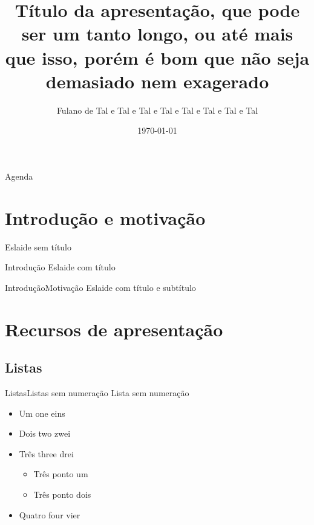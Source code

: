 \documentclass[
	brazilian, %
	14pt, %
]{beamer}
\title{Título da apresentação, que pode ser um tanto longo, ou até mais que isso, porém é bom que não seja demasiado nem exagerado}
\author{Fulano de Tal e Tal e Tal e Tal e Tal e Tal e Tal e Tal}
\date{\today} %
\institute{DC -- UFSCar}
\begin{document}
\begin{frame}
	\titlepage	
	
\end{frame}

\begin{frame}{Agenda}
	\tableofcontents
	
	
	\note{\structure{\tableofcontents}}
\end{frame}


%

\section{Introdução e motivação}
\begin{frame}
	Eslaide sem título
\end{frame}

\begin{frame}{Introdução}
	Eslaide com título
\end{frame}

\begin{frame}{Introdução}{Motivação}
	Eslaide com título e subtítulo
\end{frame}


\section[Recursos]{Recursos de apresentação}

\subsection{Listas}

\begin{frame}{Listas}{Listas sem numeração}
	Lista sem numeração
	
	\begin{itemize}
		\item Um one eins
		\item Dois two zwei
		\item Três three drei
			\begin{itemize}
				\item Três ponto um
				\item Três ponto dois
			\end{itemize}
		\item Quatro four vier
	\end{itemize}
\end{frame}
\end{document}
